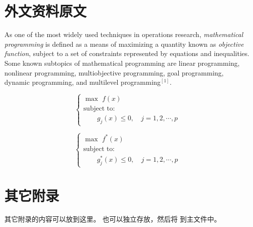 
\chapter{外文资料原文}
\label{chap:appx:1}
As one of the most widely used techniques in operations research, {\em mathematical programming} is defined as a means of maximizing a quantity known as {\em objective function}, subject to a set of constraints represented by equations and inequalities.
Some known subtopics of mathematical programming are linear programming, nonlinear programming, multiobjective programming, goal programming, dynamic programming, and multilevel programming$^{[1]}$.

\begin{equation} \tag*{(chap:appx:tag1)}
    \left\{ \begin{array}{l}
        \max \,\,f(x)      \\ [0.1 cm]
        \mbox{subject to:} \\ [0.1 cm]
        \qquad g_j(x)\le 0, \quad j=1,2,\cdots,p
    \end{array} \right.
\end{equation}

\begin{equation} \tag*{(chap:appx:tag2)}
    \left\{ \begin{array}{l}
        \max \,\,f^\ast(x) \\ [0.1 cm]
        \mbox{subject to:} \\ [0.1 cm]
        \qquad g_j^\ast(x)\le 0, \quad j=1,2,\cdots,p
    \end{array} \right.
\end{equation}

\chapter{其它附录}
\label{chap:appx:2}
其它附录的内容可以放到这里。
也可以独立存放，然后将 \verb|| 到主文件中。
